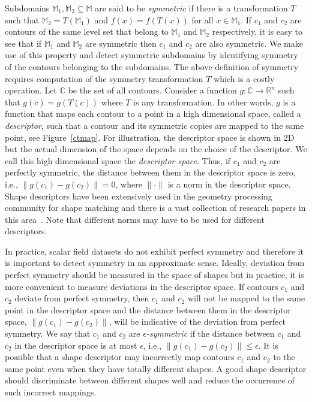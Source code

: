 \documentclass[review,journal]{vgtc}         %
\begin{document}
Subdomains $\mathbb{M}_1, \mathbb{M}_2 \subseteq \mathbb{M}$ are said to be \emph{symmetric} 
if there is a transformation $T$ such that ${\mathbb{M}_2=T(\mathbb{M}_1)}$ and 
${f(x)=f(T(x))}$ for all $x \in \mathbb{M}_1$. If $c_1$ and $c_2$ are contours of the same level
set that belong to $\mathbb{M}_1$ and $\mathbb{M}_2$ respectively, it is easy to see that if 
$\mathbb{M}_1$ and $\mathbb{M}_2$ are symmetric then $c_1$ and $c_2$ are also symmetric. 
We make use of this property and detect symmetric subdomains by identifying symmetry of the 
contours belonging to the subdomains. The above definition of symmetry requires computation of the symmetry 
transformation $T$ which is a costly operation. Let $\mathbb{C}$ be the set of all contours. 
Consider a function $g : \mathbb{C} \rightarrow \mathbb{R}^n$ such that $g(c) = g(T(c))$
where $T$ is any transformation. In other words, $g$ is a function that maps each
contour to a point in a high dimensional space, called a \emph{descriptor}, 
such that a contour and its symmetric copies are mapped to the same point, see Figure~\ref{ctmap}.
For illustration, the descriptor space is shown in 2D but the actual dimension of the space
depends on the choice of the descriptor. We call this high dimensional space the
\emph{descriptor space}. Thus, if $c_1$ and $c_2$ are perfectly symmetric,
the distance between them in the descriptor space is zero, i.e., 
$\lVert g(c_1)-g(c_2) \rVert = 0$, where $\lVert \cdot \rVert$ is a norm in
the descriptor space. Shape descriptors have been extensively used in the
geometry processing community for shape matching and there is a
vast collection of research papers in this 
area~\cite{lian2013,van2011,tangelder2008survey,qin2008content}. Note that
different norms may have to be used for different descriptors. 

In practice, scalar field datasets do not exhibit perfect symmetry and therefore
it is important to detect symmetry in an approximate sense. Ideally, deviation
from perfect symmetry should be measured in the space of shapes but in practice,
it is more convenient to measure deviations in the descriptor space. If contours $c_1$ and 
$c_2$ deviate from perfect symmetry, then $c_1$ and $c_2$ will not be mapped
to the same point in the descriptor space and the distance between
them in the descriptor space, $\lVert g(c_1)-g(c_2) \rVert$, will be indicative
of the deviation from perfect symmetry. We say that $c_1$ and $c_2$ are
\emph{$\epsilon$-symmetric} if the distance between $c_1$ and $c_2$ in the descriptor 
space is at most $\epsilon$, i.e., $\lVert g(c_1)-g(c_2) \rVert \leq \epsilon$.
It is possible that a shape descriptor may incorrectly map contours $c_1$ and 
$c_2$ to the same point even when they have totally different shapes. A good shape descriptor should 
discriminate between different shapes well and reduce the occurrence of such incorrect
mappings. 
\end{document}
